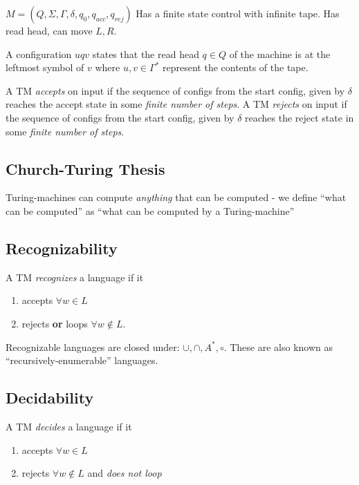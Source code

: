 $M = (Q,\Sigma,\Gamma,\delta,q_0, q_{acc}, q_{rej})$ Has a finite state control with infinite tape. Has read head, can move $L,R$.

A configuration $uqv$ states that the read head $q\in Q$ of the machine is at the leftmost symbol of $v$ where $u,v\in \Gamma^*$ represent the contents of the tape.

A TM \emph{accepts} on input if the sequence of configs from the start config, given by $\delta$ reaches the accept state in some \emph{finite number of steps}. A TM \emph{rejects} on input if the sequence of configs from the start config, given by $\delta$ reaches the reject state in some \emph{finite number of steps}.

\subsection{Church-{}Turing Thesis}
\label{church-turingthesis}

Turing-{}machines can compute \emph{anything} that can be computed -{} we define ``what can be computed'' as ``what can be computed by a Turing-{}machine''

\subsection{Recognizability}
\label{recognizability}

A TM \emph{recognizes} a language if it

\begin{enumerate}
\item accepts $\forall w\in L$

\item rejects \textbf{or} loops $\forall w\notin L$.

\end{enumerate}

Recognizable languages are closed under: $\cup,\cap,A^*,\circ$. These are also known as ``recursively-{}enumerable'' languages.

\subsection{Decidability}
\label{decidability}

A TM \emph{decides} a language if it

\begin{enumerate}
\item accepts $\forall w\in L$

\item rejects $\forall w\notin L$ and \emph{does not loop}

\end{enumerate}


